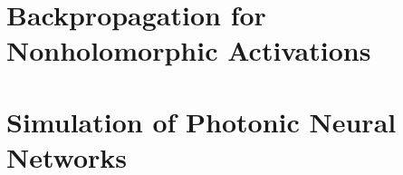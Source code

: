 \documentclass{report}
\begin{document}

\appendix

\chapter{Backpropagation for Nonholomorphic Activations}


\chapter{Simulation of Photonic Neural Networks}





\end{document}
